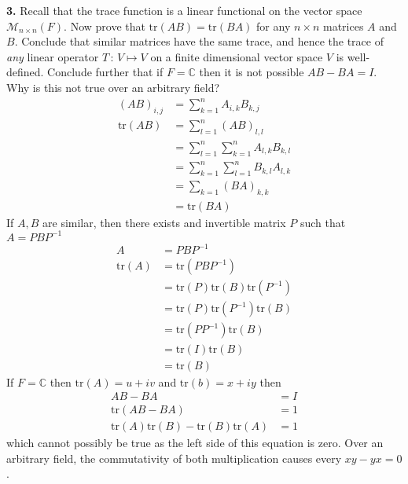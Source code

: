 \documentclass[11pt]{amsart}
\theoremstyle{definition}  %
\newcommand{\C}{\mathbb{C}}
\begin{document}
\newpage
\vskip 0.1cm
\newcommand{\trace}{\mathrm{tr}}
\noindent
{\bf 3.}  Recall that the trace function is a linear functional on the vector space $\mathcal{M}_{n \times n}(F)$. Now prove that $\mathrm{tr}(AB) = \mathrm{tr}(BA)$ 
for any $n \times n$ matrices $A$ and $B$. Conclude that similar matrices have the same trace, and  hence the trace of {\it any} linear operator $T \, : \, V \mapsto V$ on
a finite dimensional vector space $V$ is well-defined.  Conclude further that if $F = \C$ then it is 
not possible $AB - BA = I$. Why is this not true over an arbitrary field? \\
\begin{align*}
	(AB)_{i,j} &= \sum_{k=1}^n A_{i,k}B_{k,j} \\
	\trace(AB) &= \sum_{l=1}^n (AB)_{l,l} \\
	&= \sum_{l=1}^n \sum_{k=1}^n A_{l,k}B_{k,l} \\
	&= \sum_{k=1}^n \sum_{l=1}^n B_{k,l}A_{l,k} \\
	&= \sum_{k=1} (BA)_{k,k}\\
	&= \trace(BA)
\end{align*}If $A,B$ are similar, then there exists and invertible matrix $P$ such that $A=PBP^{-1}$
\begin{align*}
	A&=PBP^{-1}\\
	\trace(A) &= \trace(PBP^{-1})\\
	&= \trace(P)\trace(B)\trace(P^{-1}) \\
	&= \trace(P)\trace(P^{-1})\trace(B) \\
	&= \trace(PP^{-1})\trace(B) \\
	&= \trace(I)\trace(B)\\
	&= \trace(B)
\end{align*}If $F=\C$ then $\trace(A)=u+iv$ and $\trace(b)=x+iy$ then
\begin{align*}
	AB-BA &= I\\
	\trace(AB-BA) &= 1 \\
	\trace(A)\trace(B)-\trace(B)\trace(A) &= 1 
\end{align*}which cannot possibly be true as the left side of this equation is zero.  Over an arbitrary field, the commutativity of both multiplication causes every $xy-yx=0$.
\\
\end{document}
